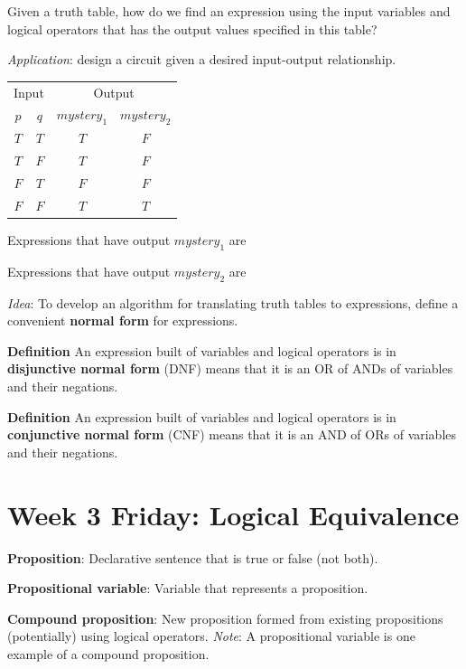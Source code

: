 \documentclass[12pt, oneside]{article}
\begin{document}
Given a truth table, how do we find an expression
using the input variables and logical operators that has the 
output values specified in this table?

{\it Application}: design a circuit given a desired input-output relationship.

\begin{center}
\begin{tabular}{cc||cc}
\multicolumn{2}{c||}{Input}  &\multicolumn{2}{c}{Output}\\
$p$ & $q$& $mystery_1$ & $mystery_2$\\
\hline
$T$ & $T$  & $T$ & $F$\\
$T$ & $F$  & $T$ & $F$\\
$F$ & $T$  & $F$ & $F$\\
$F$ & $F$  & $T$ & $T$\\
\end{tabular}
\end{center}


Expressions that have output $mystery_1$ are

\vspace{100pt}

Expressions that have output $mystery_2$ are

\vspace{100pt}

{\it Idea}: To develop an algorithm for translating truth tables to expressions, 
define a convenient {\bf normal form} for expressions. 

{\bf  Definition} An expression built of variables and logical 
operators is in {\bf disjunctive normal form}  (DNF) means
that it is an OR of ANDs of variables and their negations.

{\bf  Definition} An expression built of variables and logical 
operators is in {\bf conjunctive normal form}  (CNF) means
that it is an AND of ORs of variables and their negations.
 \newpage
\section*{Week 3 Friday: Logical Equivalence}


{\bf Proposition}: Declarative sentence that is true or false (not both).

{\bf Propositional variable}: Variable that represents a proposition.

{\bf Compound proposition}: New proposition formed from existing propositions (potentially) using logical operators.
{\it Note}: A propositional variable is one example of a compound proposition.
\end{document}
